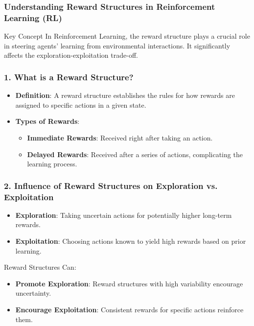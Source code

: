 \documentclass[aspectratio=169]{beamer}
\begin{document}
\begin{frame}
  \titlepage
\end{frame}

\begin{frame}[fragile]
  \frametitle{Understanding Reward Structures in Reinforcement Learning (RL)}
  \begin{block}{Key Concept}
    In Reinforcement Learning, the reward structure plays a crucial role in steering agents' learning from environmental interactions. It significantly affects the exploration-exploitation trade-off.
  \end{block}
\end{frame}

\begin{frame}[fragile]
  \frametitle{1. What is a Reward Structure?}
  \begin{itemize}
    \item \textbf{Definition}: A reward structure establishes the rules for how rewards are assigned to specific actions in a given state.
    \item \textbf{Types of Rewards}:
      \begin{itemize}
        \item \textbf{Immediate Rewards}: Received right after taking an action.
        \item \textbf{Delayed Rewards}: Received after a series of actions, complicating the learning process.
      \end{itemize}
  \end{itemize}
\end{frame}

\begin{frame}[fragile]
  \frametitle{2. Influence of Reward Structures on Exploration vs. Exploitation}
  \begin{itemize}
    \item \textbf{Exploration}: Taking uncertain actions for potentially higher long-term rewards.
    \item \textbf{Exploitation}: Choosing actions known to yield high rewards based on prior learning.
  \end{itemize}
  
  \begin{block}{Reward Structures Can:}
    \begin{itemize}
      \item \textbf{Promote Exploration}: Reward structures with high variability encourage uncertainty.
      \item \textbf{Encourage Exploitation}: Consistent rewards for specific actions reinforce them.
    \end{itemize}
  \end{block}
\end{frame}
\end{document}
